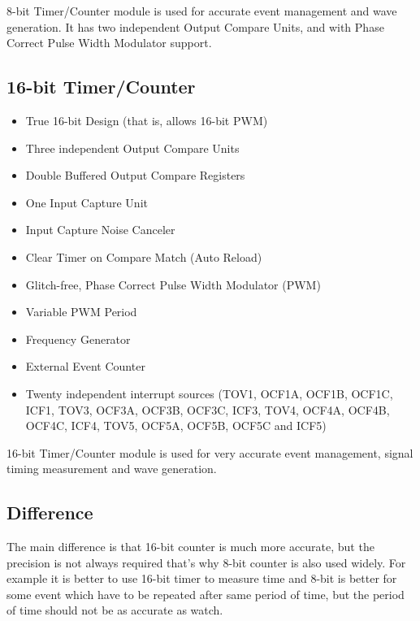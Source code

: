 \documentclass[english]{article}
\begin{document}
8-bit Timer/Counter module is used for accurate event management and wave generation. It has two independent Output Compare Units, and with Phase Correct Pulse Width Modulator support.
\subsection{16-bit Timer/Counter}
\begin{itemize}
\item True 16-bit Design (that is, allows 16-bit PWM)
\item Three independent Output Compare Units
\item Double Buffered Output Compare Registers
\item One Input Capture Unit
\item Input Capture Noise Canceler
\item Clear Timer on Compare Match (Auto Reload)
\item Glitch-free, Phase Correct Pulse Width Modulator (PWM)
\item Variable PWM Period
\item Frequency Generator
\item External Event Counter
\item Twenty independent interrupt sources (TOV1, OCF1A, OCF1B, OCF1C, ICF1, TOV3, OCF3A, OCF3B, OCF3C, ICF3, TOV4, OCF4A, OCF4B, OCF4C, ICF4, TOV5, OCF5A, OCF5B, OCF5C and ICF5)
\end{itemize}
16-bit Timer/Counter module is used for very accurate event management, signal timing measurement and wave generation.
\subsection{Difference}
The main difference is that 16-bit counter is much more accurate, but the precision is not always required that's why 8-bit counter is also used widely. For example it is better to use 16-bit timer to measure time and 8-bit is better for some event which have to be repeated after same period of time, but the period of time should not be as accurate as watch.
\end{document}
